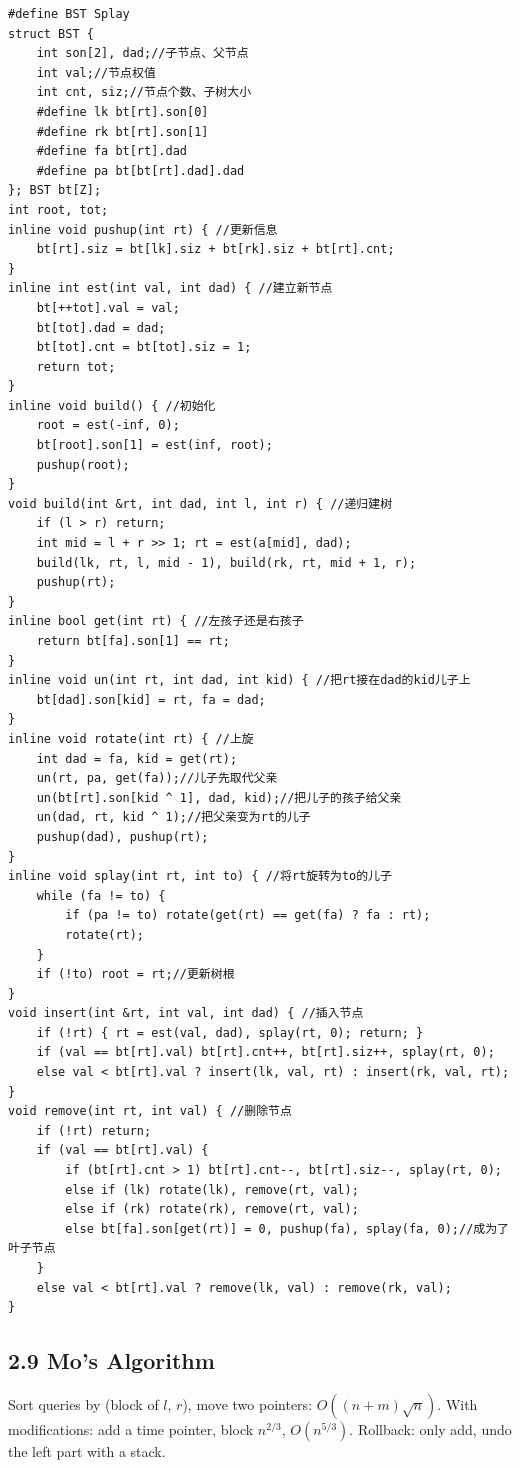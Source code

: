 \documentclass[8pt]{extarticle}
\begin{document}
\begin{multicols*}{3}
\begin{lstlisting}
#define BST Splay
struct BST {
    int son[2], dad;//子节点、父节点
    int val;//节点权值
    int cnt, siz;//节点个数、子树大小
    #define lk bt[rt].son[0]
    #define rk bt[rt].son[1]
    #define fa bt[rt].dad
    #define pa bt[bt[rt].dad].dad
}; BST bt[Z];
int root, tot;
inline void pushup(int rt) { //更新信息
    bt[rt].siz = bt[lk].siz + bt[rk].siz + bt[rt].cnt;
}
inline int est(int val, int dad) { //建立新节点
    bt[++tot].val = val;
    bt[tot].dad = dad;
    bt[tot].cnt = bt[tot].siz = 1;
    return tot;
}
inline void build() { //初始化
    root = est(-inf, 0);
    bt[root].son[1] = est(inf, root);
    pushup(root);
}
void build(int &rt, int dad, int l, int r) { //递归建树
    if (l > r) return;
    int mid = l + r >> 1; rt = est(a[mid], dad);
    build(lk, rt, l, mid - 1), build(rk, rt, mid + 1, r);
    pushup(rt);
}
inline bool get(int rt) { //左孩子还是右孩子
    return bt[fa].son[1] == rt;
}
inline void un(int rt, int dad, int kid) { //把rt接在dad的kid儿子上
    bt[dad].son[kid] = rt, fa = dad;
}
inline void rotate(int rt) { //上旋
    int dad = fa, kid = get(rt);
    un(rt, pa, get(fa));//儿子先取代父亲
    un(bt[rt].son[kid ^ 1], dad, kid);//把儿子的孩子给父亲
    un(dad, rt, kid ^ 1);//把父亲变为rt的儿子
    pushup(dad), pushup(rt);
}
inline void splay(int rt, int to) { //将rt旋转为to的儿子
    while (fa != to) {
        if (pa != to) rotate(get(rt) == get(fa) ? fa : rt);
        rotate(rt);
    }
    if (!to) root = rt;//更新树根
}
void insert(int &rt, int val, int dad) { //插入节点
    if (!rt) { rt = est(val, dad), splay(rt, 0); return; }
    if (val == bt[rt].val) bt[rt].cnt++, bt[rt].siz++, splay(rt, 0);
    else val < bt[rt].val ? insert(lk, val, rt) : insert(rk, val, rt);
}
void remove(int rt, int val) { //删除节点
    if (!rt) return;
    if (val == bt[rt].val) {
        if (bt[rt].cnt > 1) bt[rt].cnt--, bt[rt].siz--, splay(rt, 0);
        else if (lk) rotate(lk), remove(rt, val);
        else if (rk) rotate(rk), remove(rt, val);
        else bt[fa].son[get(rt)] = 0, pushup(fa), splay(fa, 0);//成为了叶子节点
    }
    else val < bt[rt].val ? remove(lk, val) : remove(rk, val);
}
\end{lstlisting}

\subsection*{2.9 Mo's Algorithm}

Sort queries by (block of $l$, $r$), move two pointers: $O((n + m)\sqrt n)$. With modifications: add a time pointer, block $n^{2/3}$, $O(n^{5/3})$. Rollback: only add, undo the left part with a stack.



\end{multicols*}
\end{document}
